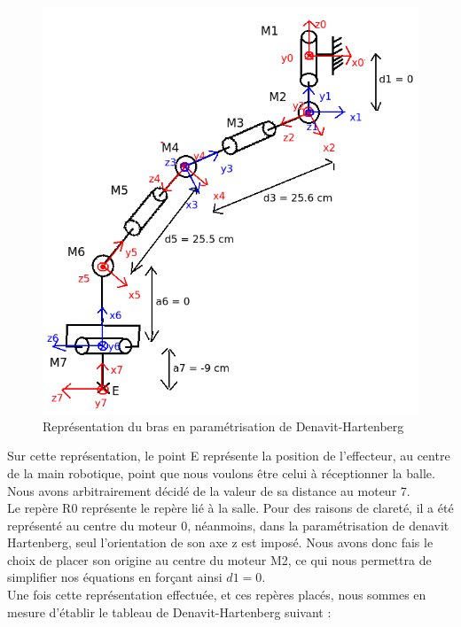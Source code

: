 \begin{figure}[!htc]
	\begin{center}
		\includegraphics[scale=0.7]{images/denavit.png}
		\caption{Représentation du bras en paramétrisation de Denavit-Hartenberg} 
		\label{denavit}
	\end{center}
\end{figure}

Sur cette représentation, le point E représente la position de l'effecteur, au centre de la main robotique, point que nous voulons être celui à réceptionner la balle. Nous avons arbitrairement décidé de la valeur de sa distance au moteur 7.\\

Le repère R0 représente le repère lié à la salle. Pour des raisons de clareté, il a été représenté au centre du moteur 0, néanmoins, dans la paramétrisation de denavit Hartenberg, seul l'orientation de son axe z est imposé. Nous avons donc fais le choix de placer son origine au centre du moteur M2, ce qui nous permettra de simplifier nos équations en forçant ainsi $d1 = 0$.\\

Une fois cette représentation effectuée, et ces repères placés, nous sommes en mesure d'établir le tableau de Denavit-Hartenberg suivant :\\

